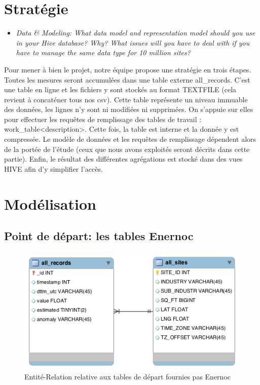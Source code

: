 \section{Stratégie}

\begin{itemize}
  \item \emph{Data \& Modeling: What data model and representation model should you use in your Hive database? Why?  What issues will you have to deal with if you have to manage the same data  type for 10 million sites?}
\end{itemize}

\par Pour mener à bien le projet, notre équipe propose une stratégie en trois étapes. Toutes les mesures seront accumulées dans une table externe all\_records. C’est une table en ligne et les fichiers y sont stockés au format TEXTFILE (cela revient à concaténer tous nos csv). Cette table représente un niveau immuable des données, les lignes n’y sont ni modifiées ni supprimées. On s’appuie sur elles pour effectuer les requêtes de remplissage des tables de travail : work\_table<description>. Cette fois, la table est interne et la donnée y est compressée. Le modèle de données et les requêtes de remplissage dépendent alors de la portée de l’étude (ceux que nous avons exploités seront décrits dans cette partie). Enfin, le résultat des différentes agrégations est stocké dans des vues HIVE afin d’y simplifier l’accès.

\section{Modélisation}

\subsection{Point de départ: les tables Enernoc}

\begin{figure}[h!]
\centering
\includegraphics[scale=0.5]{./image/ER.png}
\caption{Entité-Relation relative aux tables de départ fournies pas Enernoc}
\end{figure}


